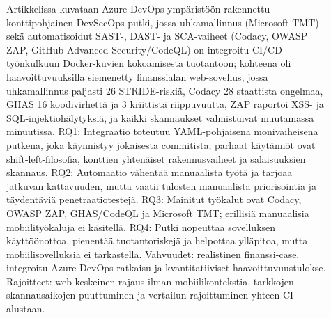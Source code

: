 \documentclass[bscthesis,finnish,oneside,biblatex]{uefcsthesis}
\begin{document}
    \begin{description}
        \item[\cite{kushwaha2024_cct}]Artikkelissa kuvataan Azure DevOps-ympäristöön rakennettu konttipohjainen DevSecOps-putki, jossa uhkamallinnus (Microsoft TMT) sekä automatisoidut SAST-, DAST- ja SCA-vaiheet (Codacy, OWASP ZAP, GitHub Advanced Security/CodeQL) on integroitu CI/CD-työnkulkuun Docker-kuvien kokoamisesta tuotantoon; kohteena oli haavoittuvuuksilla siemenetty finanssialan web-sovellus, jossa uhkamallinnus paljasti 26 STRIDE-riskiä, Codacy 28 staattista ongelmaa, GHAS 16 koodivirhettä ja 3 kriittistä riippuvuutta, ZAP raportoi XSS- ja SQL-injektiohälytyksiä, ja kaikki skannaukset valmistuivat muutamassa minuutissa. RQ1: Integraatio toteutuu YAML-pohjaisena monivaiheisena putkena, joka käynnistyy jokaisesta commitista; parhaat käytännöt ovat shift-left-filosofia, konttien yhtenäiset rakennusvaiheet ja salaisuuksien skannaus. RQ2: Automaatio vähentää manuaalista työtä ja tarjoaa jatkuvan kattavuuden, mutta vaatii tulosten manuaalista priorisointia ja täydentäviä penetraatiotestejä. RQ3: Mainitut työkalut ovat Codacy, OWASP ZAP, GHAS/CodeQL ja Microsoft TMT; erillisiä manuaalisia mobiilityökaluja ei käsitellä. RQ4: Putki nopeuttaa sovelluksen käyttöönottoa, pienentää tuotantoriskejä ja helpottaa ylläpitoa, mutta mobiilisovelluksia ei tarkastella. Vahvuudet: realistinen finanssi-case, integroitu Azure DevOps-ratkaisu ja kvantitatiiviset haavoittuvuustulokse. Rajoitteet: web-keskeinen rajaus ilman mobiilikontekstia, tarkkojen skannausaikojen puuttuminen ja vertailun rajoittuminen yhteen CI-alustaan.
    \end{description}
\end{document}
